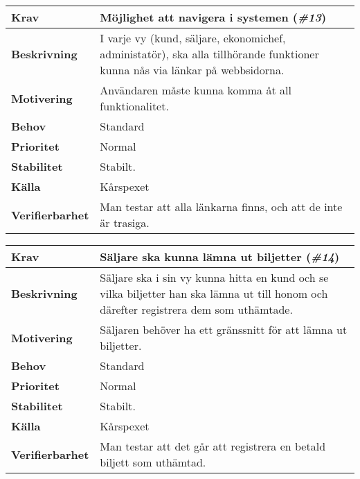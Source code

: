 \documentclass[a4paper, twoside, 11pt, titlepage]{article}
\begin{document}
	\begin{tabular} { p{2.6cm} p{12.5cm} }
		\hline
		\sffamily\textbf{Krav} & Möjlighet att navigera i systemen (\emph{\#13})  \\
		\hline
		\sffamily\textbf{Beskrivning} & I varje vy (kund, säljare, ekonomichef, administatör), ska alla tillhörande funktioner kunna nås via länkar på webbsidorna.  \\
		\hline
		\sffamily\textbf{Motivering} & Användaren måste kunna komma åt all funktionalitet.  \\
		\hline
		\sffamily\textbf{Behov} & Standard  \\
		\hline
		\sffamily\textbf{Prioritet} & Normal  \\
		\hline
		\sffamily\textbf{Stabilitet} & Stabilt.  \\
		\hline
		\sffamily\textbf{Källa} & Kårspexet  \\
		\hline
		\sffamily\textbf{Verifierbarhet} & Man testar att alla länkarna finns, och att de inte är trasiga.  \\
		\hline
	\end{tabular}
	\vspace{6mm}

	\begin{tabular} { p{2.6cm} p{12.5cm} }
		\hline
		\sffamily\textbf{Krav} & Säljare ska kunna lämna ut biljetter (\emph{\#14})  \\
		\hline
		\sffamily\textbf{Beskrivning} & Säljare ska i sin vy kunna hitta en kund och se vilka biljetter han ska lämna ut till honom och därefter registrera dem som uthämtade.  \\
		\hline
		\sffamily\textbf{Motivering} & Säljaren behöver ha ett gränssnitt för att lämna ut biljetter.  \\
		\hline
		\sffamily\textbf{Behov} & Standard  \\
		\hline
		\sffamily\textbf{Prioritet} & Normal  \\
		\hline
		\sffamily\textbf{Stabilitet} & Stabilt.  \\
		\hline
		\sffamily\textbf{Källa} & Kårspexet  \\
		\hline
		\sffamily\textbf{Verifierbarhet} & Man testar att det går att registrera en betald biljett som uthämtad.   \\
		\hline
	\end{tabular}
	\vspace{6mm}
\end{document}
